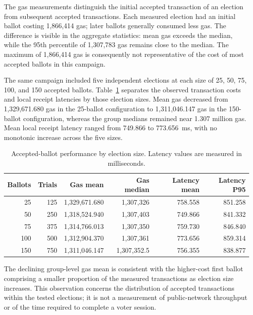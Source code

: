 The gas measurements distinguish the initial accepted transaction of an election from subsequent accepted transactions. Each measured election had an initial ballot costing 1,866,414 gas; later ballots generally consumed less gas. The difference is visible in the aggregate statistics: mean gas exceeds the median, while the 95th percentile of 1,307,783 gas remains close to the median. The maximum of 1,866,414 gas is consequently not representative of the cost of most accepted ballots in this campaign.

The same campaign included five independent elections at each size of 25, 50, 75, 100, and 150 accepted ballots. Table~\ref{tab:results-accepted-scale} separates the observed transaction costs and local receipt latencies by those election sizes. Mean gas decreased from 1,329,671.680 gas in the 25-ballot configuration to 1,311,046.147 gas in the 150-ballot configuration, whereas the group medians remained near 1.307 million gas. Mean local receipt latency ranged from 749.866 to 773.656~ms, with no monotonic increase across the five sizes.

\begin{table}[t]
\centering
\caption{Accepted-ballot performance by election size.
Latency values are measured in milliseconds.}
\label{tab:results-accepted-scale}
\scriptsize
\setlength{\tabcolsep}{3pt}
\begin{tabular}{@{}rrrrrr@{}}
\toprule
\textbf{Ballots} &
\textbf{Trials} &
\textbf{Gas mean} &
\textbf{Gas median} &
\textbf{Latency mean} &
\textbf{Latency P95} \\
\midrule
25
& 125
& 1,329,671.680
& 1,307,326
& 758.558
& 851.258 \\
50
& 250
& 1,318,524.940
& 1,307,403
& 749.866
& 841.332 \\
75
& 375
& 1,314,766.013
& 1,307,350
& 759.730
& 846.840 \\
100
& 500
& 1,312,904.370
& 1,307,361
& 773.656
& 859.314 \\
150
& 750
& 1,311,046.147
& 1,307,352.5
& 756.355
& 838.877 \\
\bottomrule
\end{tabular}
\end{table}

The declining group-level gas mean is consistent with the higher-cost first ballot comprising a smaller proportion of the measured transactions as election size increases. This observation concerns the distribution of accepted transactions within the tested elections; it is not a measurement of public-network throughput or of the time required to complete a voter session.

